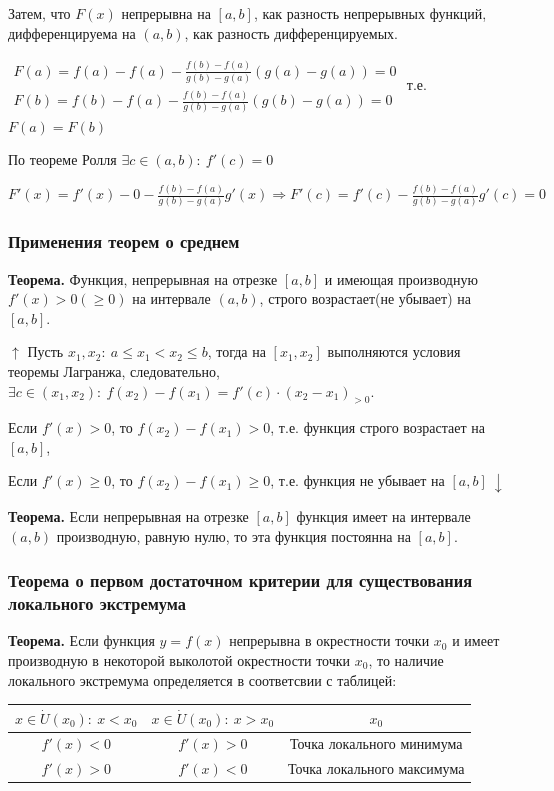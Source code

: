 \documentclass{article}
\begin{document}
Затем, что \(F(x)\) непрерывна на \([a, b]\), как разность непрерывных функций, дифференцируема на \((a, b)\), как разность дифференцируемых.

\(\begin{array}{l}
    F(a) = f(a) - f(a) - \frac{f(b)-f(a)}{g(b)-g(a)}(g(a)-g(a)) = 0\\
    F(b) = f(b) - f(a) - \frac{f(b)-f(a)}{g(b)-g(a)}(g(b)-g(a)) = 0
\end{array}\)
т.е. \(F(a) = F(b)\)

По теореме Ролля \(\exists c \in (a, b):\ f'(c) = 0\)

\(F'(x) = f'(x) - 0 - \frac{f(b) - f(a)}{g(b) - g(a)}g'(x) \Rightarrow F'(c) = f'(c) - \frac{f(b) - f(a)}{g(b) - g(a)}g'(c)=0\)

\subsubsection{Применения теорем о среднем}

\textbf{Теорема.} Функция, непрерывная на отрезке \([a, b]\) и имеющая производную \(f'(x) > 0(\geq 0)\) на интервале \((a, b)\), строго возрастает(не убывает) на \([a, b]\).

\(\uparrow\) Пусть \(x_1, x_2:\ a \leq x_1 < x_2 \leq b\), тогда на \([x_1, x_2]\) выполняются условия теоремы Лагранжа, следовательно, \(\exists c \in (x_1, x_2):\ f(x_2) - f(x_1) = f'(c) \cdot (x_2 - x_1)_{>0}\).

Если \(f'(x) > 0\), то \(f(x_2) - f(x_1) > 0\), т.е. функция строго возрастает на \([a, b]\),

Если \(f'(x) \geq 0\), то \(f(x_2) - f(x_1) \geq 0\), т.е. функция не убывает на \([a, b]\ \downarrow\)

\textbf{Теорема.} Если непрерывная на отрезке \([a, b]\) функция имеет на интервале \((a, b)\) производную, равную нулю, то эта функция постоянна на \([a, b]\).

\subsubsection{Теорема о первом достаточном критерии для существования локального экстремума}

\textbf{Теорема.} Если функция \(y=f(x)\) непрерывна в окрестности точки \(x_0\) и имеет производную в некоторой выколотой окрестности точки \(x_0\), то наличие локального экстремума определяется в соответсвии с таблицей:

\begin{tabular}{ | c | c | c | }
    \hline
    \(x \in \dot{U}(x_0):\ x < x_0\) & \(x \in \dot{U}(x_0):\ x > x_0\) & \(x_0\)\\ [4.5pt]\hline
    \(f'(x) < 0\) & \(f'(x) > 0\) & Точка локального минимума\\[4.5pt] \hline
    \(f'(x) > 0\) & \(f'(x) < 0\) & Точка локального максимума\\ [4.5pt]\hline
\end{tabular}
\end{document}
